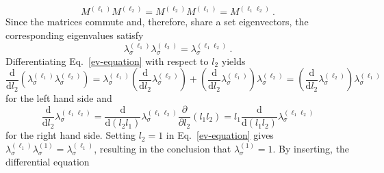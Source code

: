 	\begin{equation}
		M^{(\ell_1)}M^{(\ell_2)} = M^{(\ell_2)}M^{(\ell_1)} =		M^{(\ell_1\ell_2)}~.
	\end{equation}
	Since the matrices commute and, therefore, share a set eigenvectors, the corresponding eigenvalues satisfy
	\begin{equation}
		\lambda^{(\ell_1)}_{\sigma} \lambda^{(\ell_2)}_{\sigma} =	\lambda^{(\ell_1\ell_2)}_{\sigma} ~.
		\label{ev-equation}
	\end{equation}
	Differentiating Eq.~\eqref{ev-equation} with respect to $l_2$ yields
	\begin{equation}
		\frac{\text{d}}{\text{d}l_2} \left(\lambda^{(\ell_1)}_{\sigma} \lambda^{(\ell_2)}_{\sigma}\right) = \lambda^{(\ell_1)}_{\sigma}  \left(\frac{\text{d}}{\text{d}l_2} \lambda^{(\ell_2)}_{\sigma}\right) +  			  \left( \frac{\text{d}}{\text{d}l_2} \lambda^{(\ell_1)}_{\sigma}\right) \lambda^{(\ell_2)}_{\sigma} 	= \left(\frac{\text{d}}{\text{d}l_2} \lambda^{(\ell_2)}_{\sigma}\right) \lambda^{(\ell_1)}_{\sigma}
	\end{equation}
	for the left hand side and
	\begin{equation}
		\frac{\text{d}}{\text{d}l_2} \lambda^{(\ell_1 \ell_2)}_{\sigma} =	\frac{\text{d}}{\text{d}(l_2 l_1)} \lambda^{(\ell_1 \ell_2)}_{\sigma} \frac{\partial}{\partial l_2} (l_1 l_2) =	l_1 \frac{\text{d}}{\text{d}(l_1l_2)} \lambda^{(\ell_1 \ell_2)}_{\sigma}
	\end{equation}
	for the right hand side. Setting $l_2 = 1$ in Eq.~\eqref{ev-equation} gives $\lambda^{(\ell_1)}_{\sigma} \lambda^{(1)}_{\sigma} =	\lambda^{(\ell_1)}_{\sigma}$, resulting in the conclusion that $\lambda^{(1)}_{\sigma} =	1$.  By inserting, the differential equation
